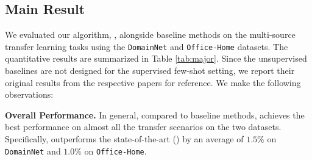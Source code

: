 














\subsection{Main Result}
We evaluated our algorithm, \ourmethod{}, alongside baseline methods on the multi-source transfer learning tasks using the \texttt{DomainNet} and \texttt{Office-Home} datasets. The quantitative results are summarized in Table \ref{tab:major}. Since the unsupervised baselines are not designed for the supervised few-shot setting, we report their original results from the respective papers for reference.
We make the following observations:


\textbf{Overall Performance.} In general, compared to baseline methods, \ourmethod{} achieves the best performance on almost all the transfer scenarios on the two datasets. Specifically, \ourmethod{} outperforms the state-of-the-art (\allsource{}) by an average of $1.5\%$ on \texttt{DomainNet} and $1.0\%$ on \texttt{Office-Home}.


